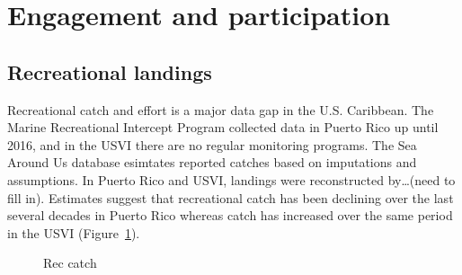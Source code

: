 \documentclass[
  letterpaper,
  oneside,
  open=any]{scrbook}
\begin{document}
\section{Engagement and
participation}\label{engagement-and-participation}

\subsection{Recreational landings}\label{recreational-landings}

Recreational catch and effort is a major data gap in the U.S. Caribbean.
The Marine Recreational Intercept Program collected data in Puerto Rico
up until 2016, and in the USVI there are no regular monitoring programs.
The Sea Around Us database esimtates reported catches based on
imputations and assumptions. In Puerto Rico and USVI, landings were
reconstructed by\ldots(need to fill in). Estimates suggest that
recreational catch has been declining over the last several decades in
Puerto Rico whereas catch has increased over the same period in the USVI
(Figure~\ref{fig-reccatch}).

\begin{figure}


\caption{\label{fig-reccatch}Rec catch}

\end{figure}%
\end{document}
